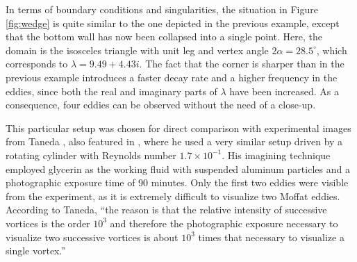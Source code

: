\documentclass{article}
\begin{document}
\begin{example}
\label{ex:triangle}
In terms of boundary conditions and singularities, the situation in Figure
\ref{fig:wedge} is quite similar to the one depicted in the previous
example, except that the bottom wall has now been collapsed into a single
point. Here, the domain is the isosceles triangle with unit leg and vertex
angle $2\alpha = 28.5^\circ$, which corresponds to $\lambda = 9.49 + 4.43i$.
The fact that the corner is sharper than in the previous example introduces
a faster decay rate and a higher frequency in the eddies, since both the
real and imaginary parts of $\lambda$ have been increased. As a consequence,
four eddies can be observed without the need of a close-up.

This particular setup was chosen for direct comparison with experimental images
from Taneda \cite[Fig.~19]{taneda79}, also featured in
\cite[Fig.~10]{vandyke82}, where he used a very similar setup driven by a
rotating cylinder with Reynolds number $1.7\times10^{-1}$. His imagining
technique employed glycerin as the working fluid with suspended aluminum
particles and a photographic exposure time of 90 minutes. Only the first two
eddies were visible from the experiment, as it is extremely difficult to
visualize two Moffat eddies. According to Taneda, ``the reason is that the
relative intensity of successive vortices is the order $10^3$ and therefore
the photographic exposure necessary to visualize two successive vortices is
about $10^3$ times that necessary to visualize a single vortex.''


\end{example}
\end{document}
